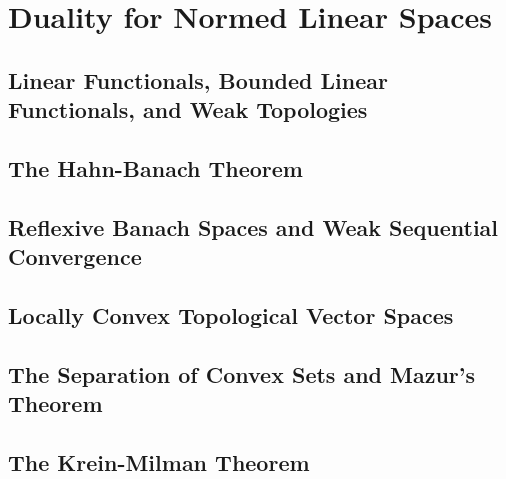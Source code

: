 \chapter{Duality for Normed Linear Spaces}

\section{Linear Functionals, Bounded Linear Functionals, and Weak Topologies}
\section{The Hahn-Banach Theorem}
\section{Reflexive Banach Spaces and Weak Sequential Convergence}
\section{Locally Convex Topological Vector Spaces}
\section{The Separation of Convex Sets and Mazur's Theorem}
\section{The Krein-Milman Theorem}
